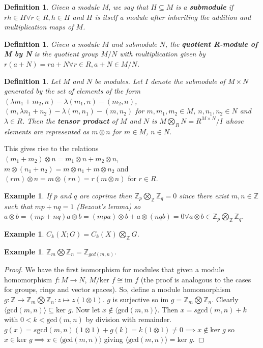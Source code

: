 \documentclass{article}
\newtheorem{definition}[theorem]{Definition}
\newtheorem{example}[theorem]{Example}
\begin{document}
\begin{definition}
Given a module M, we say that $H\subseteq M$ is a \textbf{submodule} if $rh\in H\forall r\in R,h\in H$ and $H$ is itself a module after inheriting the addition and multiplication maps of $M$.
\end{definition}

\begin{definition}
Given a module $M$ and submodule $N$, the \textbf{quotient R-module of M by N} is the quotient group $M/N$ with multiplication given by $r(a+N)=ra+N\forall r\in R,a+N\in M/N$.
\end{definition}

\begin{definition}
Let $M$ and $N$ be modules. Let $I$ denote the submodule of $M\times N$ generated by the set of elements of the form $(\lambda m_1+m_2,n)-\lambda(m_1,n)-(m_2,n)$, $(m,\lambda n_1+n_2)-\lambda(m,n_1)-(m,n_2)$ for $m,m_1,m_2\in M$, $n,n_1,n_2\in N$ and $\lambda\in R$. Then the \textbf{tensor product} of $M$ and $N$ is $M\bigotimes_R N=R^{M\times N}/I$ whose elements are represented as $m\otimes n$ for $m\in M$, $n\in N$.
\end{definition}

\noindent This gives rise to the relations\\ $(m_1+m_2)\otimes n=m_1\otimes n+m_2\otimes n$,\\
$m\otimes(n_1+n_2)=m\otimes n_1+m\otimes n_2$ and\\
$(rm)\otimes n=m\otimes (rn)=r(m\otimes n)$ for $r\in R$.

\begin{example}
If $p$ and $q$ are coprime then $\mathbb{Z}_p\bigotimes_\mathbb{Z}\mathbb{Z}_q=0$ since there exist $m,n\in\mathbb{Z}$ such that $mp+nq=1$ (Bezout's lemma) so $a\otimes b=(mp+nq)a\otimes b=(mpa)\otimes b + a\otimes(nqb)=0\forall a\otimes b\in\mathbb{Z}_p\bigotimes_\mathbb{Z}\mathbb{Z}_q$.
\end{example}
\begin{example}
$C_k(X;G)=C_k(X)\bigotimes_\mathbb{Z}G$.
\end{example}

\begin{example}
$\mathbb{Z}_m\bigotimes\mathbb{Z}_n=\mathbb{Z}_{gcd(m,n)}$.
\end{example}
\begin{proof}
We have the first isomorphism for modules that given a module homomorphism $f:M\to N$, $M/\text{ker }f\cong\text{im }f$ (the proof is analogous to the cases for groups, rings and vector spaces).
So, define a module homomorphism $g\colon\mathbb{Z}\to\mathbb{Z}_m\bigotimes\mathbb{Z}_n:z\mapsto z(1\otimes 1)$. $g$ is surjective so $\text{im }g=\mathbb{Z}_m\bigotimes\mathbb{Z}_n$. Clearly $\langle\text{gcd}(m,n)\rangle\subseteq\text{ker }g$. Now let $x\notin \langle\text{gcd}(m,n)\rangle$. Then $x=s\text{gcd}(m,n)+k$ with $0<k<\text{gcd}(m,n)$ by division with remainder. $g(x)=s\text{gcd}(m,n)(1\otimes 1)+g(k)=k(1\otimes 1)\neq 0\implies x\notin\text{ker }g$ so $x\in\text{ker }g\implies x\in\langle\text{gcd}(m,n)\rangle$ giving $\langle\text{gcd}(m,n)\rangle=\text{ker }g$.
\end{proof}
\end{document}
